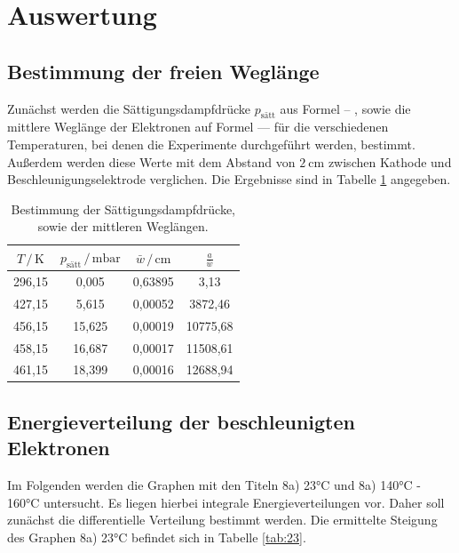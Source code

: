 \section{Auswertung}
\label{sec:Auswertung}

\subsection{Bestimmung der freien Weglänge}

Zunächst werden die Sättigungsdampfdrücke $p_\text{sätt}$ aus Formel -- , sowie die mittlere Weglänge
der Elektronen auf Formel --- für die verschiedenen Temperaturen, bei denen die Experimente durchgeführt
werden, bestimmt. Außerdem werden diese Werte mit dem Abstand von $\SI{2}{\centi\meter}$ zwischen Kathode
und Beschleunigungselektrode verglichen. Die Ergebnisse sind in Tabelle \ref{tab:weg} angegeben. 

\begin{table}
  \centering
  \caption{Bestimmung der Sättigungsdampfdrücke, sowie der mittleren Weglängen.}
  \label{tab:weg}
  \begin{tabular}{c c c c}
  \toprule
  $ T \,/\, \si{\kelvin} $ & $ p_\text{sätt} \,/\, \si{\milli\bar} $ & $\bar{w} \,/\, \si{\centi\meter}$ & $\frac{a}{\bar{w}}$\\
  \midrule 
  296,15 &  0,005 & 0,63895 &     3,13\\
  427,15 &  5,615 & 0,00052 &  3872,46\\
  456,15 & 15,625 & 0,00019 & 10775,68\\
  458,15 & 16,687 & 0,00017 & 11508,61\\
  461,15 & 18,399 & 0,00016 & 12688,94\\
  \bottomrule
  \end{tabular}
  \end{table}

\subsection{Energieverteilung der beschleunigten Elektronen}

Im Folgenden werden die Graphen mit den Titeln 8a) 23°C und 8a) 140°C - 160°C untersucht. Es liegen 
hierbei integrale Energieverteilungen vor. Daher soll zunächst die differentielle Verteilung bestimmt
werden. Die ermittelte Steigung des Graphen 8a) 23°C befindet sich in Tabelle \ref{tab:23}.

